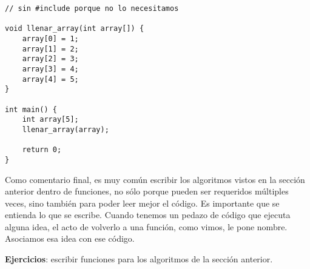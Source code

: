 \documentclass[10pt]{article}
\begin{document}
\begin{lstlisting}
// sin #include porque no lo necesitamos

void llenar_array(int array[]) {
	array[0] = 1;
	array[1] = 2;
	array[2] = 3;
	array[3] = 4;
	array[4] = 5;
}

int main() {
	int array[5];
	llenar_array(array);

	return 0;
}
\end{lstlisting}

Como comentario final, es muy común escribir los algoritmos vistos en la sección anterior dentro de funciones, no sólo porque pueden ser requeridos múltiples veces, sino también para poder leer mejor el código. Es importante que se entienda lo que se escribe. Cuando tenemos un pedazo de código que ejecuta alguna idea, el acto de volverlo a una función, como vimos, le pone nombre. Asociamos esa idea con ese código.

\bigskip

\textbf{Ejercicios}: escribir funciones para los algoritmos de la sección anterior.
\end{document}

